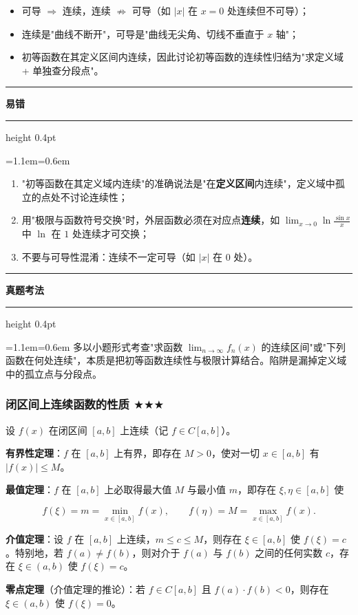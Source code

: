 \documentclass[11pt,openany,UTF8]{ctexbook}
\newcommand{\callouthead}[2]{%
  \par\addvspace{7pt}\noindent
  {\color{#1}\rule[-0.15em]{3pt}{1.05em}}\hspace{0.5em}%
  {\bfseries\color{#1}#2}\par\nobreak\vspace{-0.35em}%
  {\color{rulesep}\hrule height 0.4pt}\nobreak\vspace{0.45em}%
  \begingroup\small\setlength{\parindent}{0pt}%
  \leftskip=1.1em\rightskip=0.6em\noindent\ignorespaces}
\newcommand{\calloutend}{\par\endgroup\addvspace{7pt}}
\newenvironment{callwarn}[1]{\callouthead{warnbar}{#1}}{\calloutend}
\newenvironment{callexam}[1]{\callouthead{exambar}{#1}}{\calloutend}
\begin{document}
\begin{itemize}
\item 可导 $\Rightarrow$ 连续，连续 $\not\Rightarrow$ 可导（如 $\vert x\vert$ 在 $x=0$ 处连续但不可导）；
\item 连续是"曲线不断开"，可导是"曲线无尖角、切线不垂直于 $x$ 轴"；
\item 初等函数在其定义区间内连续，因此讨论初等函数的连续性归结为"求定义域 + 单独查分段点"。
\end{itemize}
\begin{callwarn}{易错}
\begin{enumerate}
\item "初等函数在其定义域内连续"的准确说法是"在\textbf{定义区间}内连续"，定义域中孤立的点处不讨论连续性；
\item 用"极限与函数符号交换"时，外层函数必须在对应点\textbf{连续}，如 $\lim_{x\to 0}\ln\frac{\sin x}{x}$ 中 $\ln$ 在 $1$ 处连续才可交换；
\item 不要与可导性混淆：连续不一定可导（如 $\vert x\vert$ 在 $0$ 处）。
\end{enumerate}
\end{callwarn}

\begin{callexam}{真题考法}
多以小题形式考查"求函数 $\lim_{n\to\infty}f_n(x)$ 的连续区间"或"下列函数在何处连续"，本质是把初等函数连续性与极限计算结合。陷阱是漏掉定义域中的孤立点与分段点。

\end{callexam}

\subsubsection{闭区间上连续函数的性质 $\bigstar$$\bigstar$$\bigstar$}

设 $f(x)$ 在闭区间 $[a,b]$ 上连续（记 $f\in C[a,b]$）。

\textbf{有界性定理}：$f$ 在 $[a,b]$ 上有界，即存在 $M>0$，使对一切 $x\in[a,b]$ 有 $\vert f(x)\vert\le M$。

\textbf{最值定理}：$f$ 在 $[a,b]$ 上必取得最大值 $M$ 与最小值 $m$，即存在 $\xi,\eta\in[a,b]$ 使

\[f(\xi)=m=\min_{x\in[a,b]}f(x),\qquad f(\eta)=M=\max_{x\in[a,b]}f(x).\]

\textbf{介值定理}：设 $f$ 在 $[a,b]$ 上连续，$m\le c\le M$，则存在 $\xi\in[a,b]$ 使 $f(\xi)=c$。特别地，若 $f(a)\ne f(b)$，则对介于 $f(a)$ 与 $f(b)$ 之间的任何实数 $c$，存在 $\xi\in(a,b)$ 使 $f(\xi)=c$。

\textbf{零点定理}（介值定理的推论）：若 $f\in C[a,b]$ 且 $f(a)\cdot f(b)<0$，则存在 $\xi\in(a,b)$ 使 $f(\xi)=0$。
\end{document}
